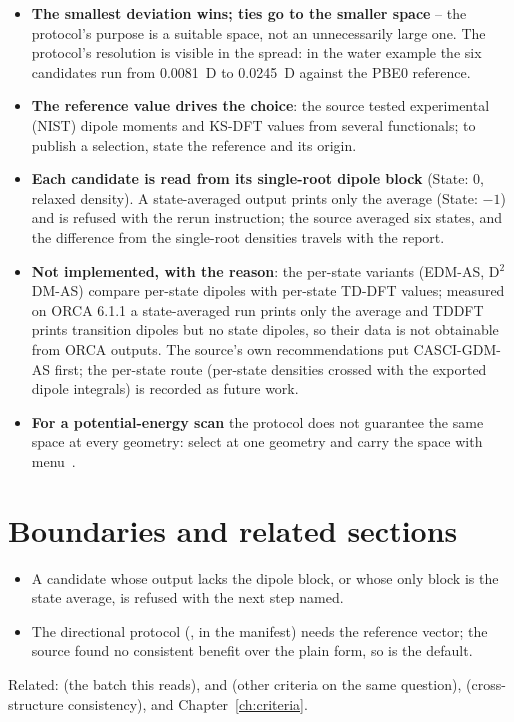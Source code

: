 \begin{readbox}
\begin{itemize}
  \item \textbf{The smallest deviation wins; ties go to the smaller space} --
    the protocol's purpose is a suitable space, not an unnecessarily large
    one.  The protocol's resolution is visible in the spread: in the water
    example the six candidates run from 0.0081~D to 0.0245~D against the
    PBE0 reference.
  \item \textbf{The reference value drives the choice}: the source tested
    experimental (NIST) dipole moments and KS-DFT values from several
    functionals; to publish a selection, state the reference and its origin.
  \item \textbf{Each candidate is read from its single-root dipole block}
    (State: 0, relaxed density).  A state-averaged output prints only the
    average (State: $-1$) and is refused with the rerun instruction; the
    source averaged six states, and the difference from the single-root
    densities travels with the report.
  \item \textbf{Not implemented, with the reason}: the per-state variants
    (EDM-AS, D$^2$DM-AS) compare per-state dipoles with per-state TD-DFT
    values; measured on ORCA 6.1.1 a state-averaged run prints only the
    average and TDDFT prints transition dipoles but no state dipoles, so
    their data is not obtainable from ORCA outputs.  The source's own
    recommendations put CASCI-GDM-AS first; the per-state route (per-state
    densities crossed with the exported dipole integrals) is recorded as
    future work.
  \item \textbf{For a potential-energy scan} the protocol does not guarantee
    the same space at every geometry: select at one geometry and carry the
    space with menu~.
\end{itemize}
\end{readbox}

\section{Boundaries and related sections}

\begin{refusalbox}
\begin{itemize}
  \item A candidate whose output lacks the dipole block, or whose only block
    is the state average, is refused with the next step named.
  \item The directional protocol (,  in the
    manifest) needs the reference vector; the source found no consistent
    benefit over the plain form, so  is the default.
\end{itemize}
\end{refusalbox}

Related:  (the batch this reads),  and  (other
criteria on the same question),  (cross-structure consistency), and
Chapter~\ref{ch:criteria}.

